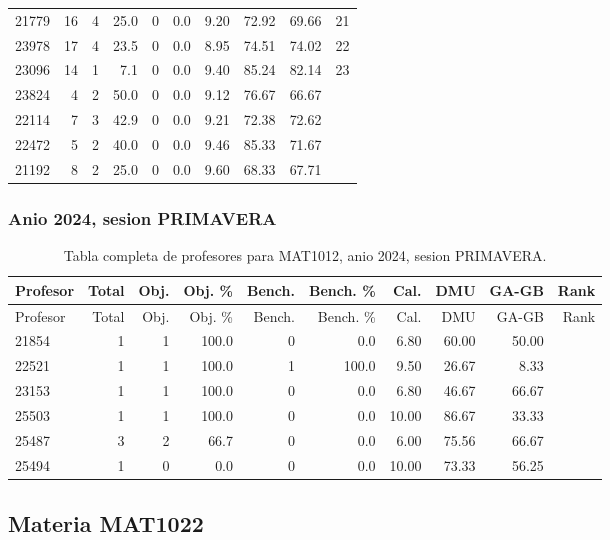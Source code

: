 \begin{longtable}{lrrrrrrrrr}
21779 & 16 & 4 & 25.0 & 0 & 0.0 & 9.20 & 72.92 & 69.66 & 21 \\
23978 & 17 & 4 & 23.5 & 0 & 0.0 & 8.95 & 74.51 & 74.02 & 22 \\
23096 & 14 & 1 & 7.1 & 0 & 0.0 & 9.40 & 85.24 & 82.14 & 23 \\
23824 & 4 & 2 & 50.0 & 0 & 0.0 & 9.12 & 76.67 & 66.67 &  \\
22114 & 7 & 3 & 42.9 & 0 & 0.0 & 9.21 & 72.38 & 72.62 &  \\
22472 & 5 & 2 & 40.0 & 0 & 0.0 & 9.46 & 85.33 & 71.67 &  \\
21192 & 8 & 2 & 25.0 & 0 & 0.0 & 9.60 & 68.33 & 67.71 &  \\
\bottomrule
\end{longtable}
\endgroup

\subsubsection{Anio 2024, sesion PRIMAVERA}

\begingroup
\scriptsize
\setlength{\tabcolsep}{3pt}
\begin{longtable}{lrrrrrrrrr}
\caption{Tabla completa de profesores para MAT1012, anio 2024, sesion PRIMAVERA.}\label{tab:prof-period-mat1012-2024-primavera}\\
\toprule
Profesor & Total & Obj. & Obj. \% & Bench. & Bench. \% & Cal. & DMU & GA-GB & Rank \\
\midrule
\endfirsthead
\toprule
Profesor & Total & Obj. & Obj. \% & Bench. & Bench. \% & Cal. & DMU & GA-GB & Rank \\
\midrule
\endhead
21854 & 1 & 1 & 100.0 & 0 & 0.0 & 6.80 & 60.00 & 50.00 &  \\
22521 & 1 & 1 & 100.0 & 1 & 100.0 & 9.50 & 26.67 & 8.33 &  \\
23153 & 1 & 1 & 100.0 & 0 & 0.0 & 6.80 & 46.67 & 66.67 &  \\
25503 & 1 & 1 & 100.0 & 0 & 0.0 & 10.00 & 86.67 & 33.33 &  \\
25487 & 3 & 2 & 66.7 & 0 & 0.0 & 6.00 & 75.56 & 66.67 &  \\
25494 & 1 & 0 & 0.0 & 0 & 0.0 & 10.00 & 73.33 & 56.25 &  \\
\bottomrule
\end{longtable}
\endgroup

\subsection{Materia MAT1022}

